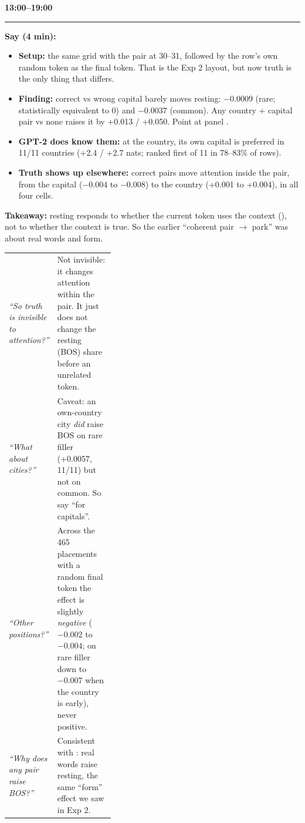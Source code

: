 \documentclass[10pt]{article}
\makeatletter
\newcommand{\stage}[2]{\par\vspace{6pt}{\large\bfseries\color{cblue}#1}\hfill{\large\bfseries #2}\\[-4pt]\rule{\linewidth}{0.6pt}\par}
\newcommand{\lab}[1]{\textbf{\color{ink2}#1}}
\newcommand{\qa}[1]{\par\begin{tabularx}{\linewidth}{@{}>{\raggedright\arraybackslash\itshape}p{0.36\linewidth}X@{}}\toprule #1 \bottomrule\end{tabularx}\par}
\makeatother
\begin{document}
\stage{Result \ding{174}: truth alone does not}{13:00--19:00}
\lab{Say (4 min):}
\begin{itemize}
\item \textbf{Setup:} the same grid with the pair at 30--31, followed by the row's own random token as the final token. That is the Exp 2 layout, but now truth is the only thing that differs.
\item \textbf{Finding:} correct vs wrong capital barely moves resting: $-0.0009$ (rare; statistically equivalent to 0) and $-0.0037$ (common). Any country + capital pair vs none raises it by +0.013 / +0.050. Point at panel .
\item \textbf{GPT-2 does know them:} at the country, its own capital is preferred in 11/11 countries (+2.4 / +2.7 nats; ranked first of 11 in 78--83\% of rows).
\item \textbf{Truth shows up elsewhere:} correct pairs move attention inside the pair, from the capital ($-0.004$ to $-0.008$) to the country (+0.001 to +0.004), in all four cells.
\end{itemize}
\lab{Takeaway:} resting responds to whether the current token uses the context (), not to whether the context is true. So the earlier ``coherent pair $\to$ park'' was about real words and form.
\qa{
``So truth is invisible to attention?'' & Not invisible: it changes attention within the pair. It just does not change the resting (BOS) share before an unrelated token. \\
``What about cities?'' & Caveat: an own-country city \emph{did} raise BOS on rare filler (+0.0057, 11/11) but not on common. So say ``for capitals''. \\
``Other positions?'' & Across the 465 placements with a random final token the effect is slightly \emph{negative} ($-0.002$ to $-0.004$; on rare filler down to $-0.007$ when the country is early), never positive. \\
``Why does any pair raise BOS?'' & Consistent with \ding{172}: real words raise resting, the same ``form'' effect we saw in Exp 2. \\
}
\end{document}
